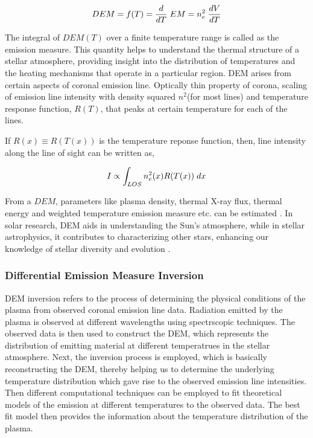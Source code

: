 \vspace{-.75cm}
\everymath{\displaystyle}
\begin{center}
    \begin{equation}
        DEM = f(T) = \frac{d}{dT}\hspace{0.1cm} EM = n_e^2 \hspace{0.1cm} \frac{dV}{dT}
    \end{equation}
\end{center}

The integral of $DEM(T)$ over a finite temperature range is called as the emission measure. This quantity helps to understand the thermal structure of a stellar atmosphere, providing insight into the distribution of temperatures and the heating mechanisms that operate in a particular region. DEM arises from certain aspects of coronal emission line. Optically thin property of corona, scaling of emission line intensity with density squared $n^2$(for most lines) and temperature response function, $R(T)$, that peaks at certain temperature for each of the lines.

If $R(x) \equiv R(T(x))$ is the temperature reponse function, then, line intensity along the line of sight can be written as,

\vspace{-.75cm}
\begin{center}
    \begin{equation}
        I \propto \int_{LOS} n_e^2(x) R(T(x)) \hspace{0.1cm} dx
    \end{equation}
\end{center}

From a $DEM$, parameters like plasma density, thermal X-ray flux, thermal energy and weighted temperature emission measure etc. can be estimated \citep{Su2018-fq}. In solar research, DEM aids in understanding the Sun's atmosphere, while in stellar astrophysics, it contributes to characterizing other stars, enhancing our knowledge of stellar diversity and evolution \citep{Namekata2023-rq}.

\subsubsection{Differential Emission Measure Inversion}

DEM inversion refers to the process of determining the physical conditions of the plasma from observed coronal emission line data. Radiation emitted by the plasma is observed at different wavelengths using spectrscopic techniques. The observed data is then used to construct the DEM, which represents the distribution of emitting material at different temperatrues in the stellar atmosphere. Next, the inversion process is employed, which is basically reconstructing the DEM, thereby helping us to determine the underlying temperature distribution which gave rise to the observed emission line intensities. Then different computational techniques can be employed to fit theoretical models of the emission at different temperatures to the observed data. The best fit model then provides the information about the temperature distribution of the plasma.\\

